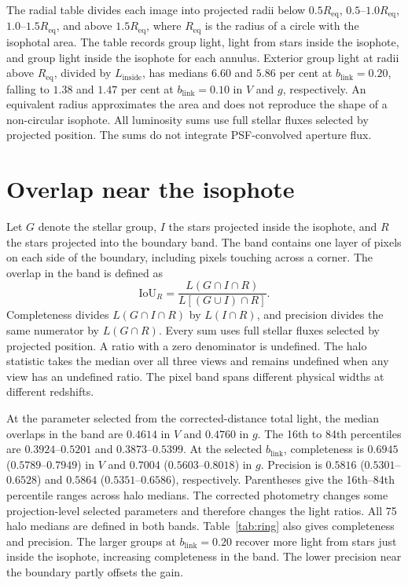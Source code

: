\documentclass[usenatbib]{mnras}
\begin{document}
The radial table divides each image into projected radii below
$0.5R_{\mathrm{eq}}$, $0.5$--$1.0R_{\mathrm{eq}}$,
$1.0$--$1.5R_{\mathrm{eq}}$, and above $1.5R_{\mathrm{eq}}$,
where $R_{\mathrm{eq}}$ is the radius of a circle with the isophotal
area. The table records group light, light from stars inside the
isophote, and group light inside the isophote for each annulus.
Exterior group light at radii above $R_{\mathrm{eq}}$, divided by
$L_{\mathrm{inside}}$, has medians $6.60$ and $5.86$ per cent at
$b_{\mathrm{link}}=0.20$, falling to $1.38$ and $1.47$ per cent at $b_{\mathrm{link}}=0.10$ in $V$
and $g$, respectively. An equivalent radius approximates the area
and does not reproduce the shape of a non-circular isophote.
All luminosity sums use full stellar fluxes selected by projected
position. The sums do not integrate PSF-convolved aperture flux.

\section{Overlap near the isophote}
Let $G$ denote the stellar group, $I$ the stars projected inside the
isophote, and $R$ the stars projected into the boundary band.
The band contains one layer of pixels on each side of the boundary,
including pixels touching across a corner. The overlap in the band is
defined as
\begin{equation}
\mathrm{IoU}_{R}=\frac{L(G\cap I\cap R)}{L[(G\cup I)\cap R]}.
\end{equation}
Completeness divides $L(G\cap I\cap R)$ by $L(I\cap R)$, and precision
divides the same numerator by $L(G\cap R)$. Every sum uses full stellar
fluxes selected by projected position. A ratio with a zero denominator
is undefined. The halo statistic takes the median over all three views
and remains undefined when any view has an undefined ratio.
The pixel band spans different physical widths at different redshifts.

At the parameter selected from the corrected-distance total light, the
median overlaps in the band are $0.4614$ in $V$ and $0.4760$ in $g$.
The 16th to 84th percentiles are $0.3924$--$0.5201$ and
$0.3873$--$0.5399$. At the selected $b_{\mathrm{link}}$, completeness is $0.6945$
($0.5789$--$0.7949$) in $V$ and $0.7004$ ($0.5603$--$0.8018$) in $g$.
Precision is $0.5816$ ($0.5301$--$0.6528$) and $0.5864$
($0.5351$--$0.6586$), respectively. Parentheses give the 16th--84th
percentile ranges across halo medians. The corrected photometry changes
some projection-level selected parameters and therefore changes the light ratios.
All 75 halo medians are defined in both bands.
Table~\ref{tab:ring} also gives completeness and precision.
The larger groups at $b_{\mathrm{link}}=0.20$ recover more light from stars just
inside the isophote, increasing completeness in the band.
The lower precision near the boundary partly offsets the gain.
\end{document}
